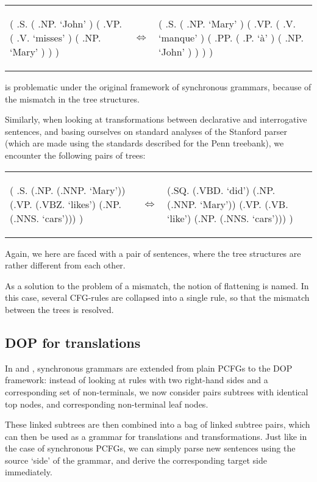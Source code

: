 \documentclass[a4paper]{article}
\theoremstyle{definition}
\begin{document}
{{\begin{tabular}{lll}
\begin{parsetree}
( .S.
	( .NP. `John' )
	( .VP.
		( .V. `misses' )
		( .NP. `Mary' )
	)
)
\end{parsetree}
& $\iff$ &
\begin{parsetree}
( .S.
	( .NP. `Mary' )
	( .VP.
		( .V. `manque' )
		( .PP.
			( .P. `à' )
			( .NP. `John' )
		)
	)
)
\end{parsetree}
\end{tabular}

is problematic under the original framework of synchronous grammars, because of
the mismatch in the tree structures.

Similarly, when looking at transformations between declarative and
interrogative sentences, and basing ourselves on standard analyses of the
Stanford parser (which are made using the standards described for the Penn
treebank), we encounter the following pairs of trees:

\begin{tabular}{lll}
\begin{parsetree}
( .S.
    (.NP. (.NNP. `Mary'))
    (.VP. (.VBZ. `likes')
      (.NP. (.NNS. `cars')))
)
\end{parsetree}
& $\iff$ &
\begin{parsetree}
  (.SQ. (.VBD. `did')
    (.NP. (.NNP. `Mary'))
    (.VP. (.VB. `like')
      (.NP. (.NNS. `cars')))
    )
\end{parsetree}
\end{tabular}

Again, we here are faced with a pair of sentences, where the tree structures
are rather different from each other.

As a solution to the problem of a mismatch, the notion of flattening is named.
In this case, several CFG-rules are collapsed into a single rule, so that the
mismatch between the trees is resolved.

\subsection{DOP for translations}

In \cite{Po} and \cite{Po2}, synchronous grammars are extended from plain PCFGs
to the DOP framework: instead of looking at rules with two right-hand sides and
a corresponding set of non-terminals, we now consider pairs subtrees with
identical top nodes, and corresponding non-terminal leaf nodes.

These linked subtrees are then combined into a bag of linked subtree pairs,
which can then be used as a grammar for translations and transformations. Just
like in the case of synchronous PCFGs, we can simply parse new sentences using
the source `side' of the grammar, and derive the corresponding target side
immediately.

}}
\end{document}
